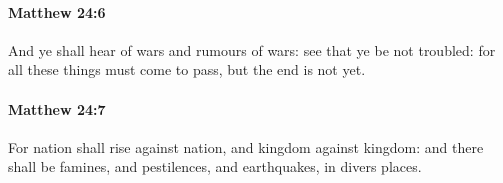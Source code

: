 		\paragraph{Matthew 24:6} %
			\label{MATTHEW-24-6}

			And ye shall hear of wars and rumours of wars: see that ye be not troubled: for all these things must come to pass, but the end is not yet.

			\begin{framed}
			\scriptsize
				\begin{compactdesc}
					\item[SBLG] 
				\end{compactdesc}
			\end{framed}

		\paragraph{Matthew 24:7} %
			\label{MATTHEW-24-7}

			For nation shall rise against nation, and kingdom against kingdom: and there shall be famines, and pestilences, and earthquakes, in divers places.

